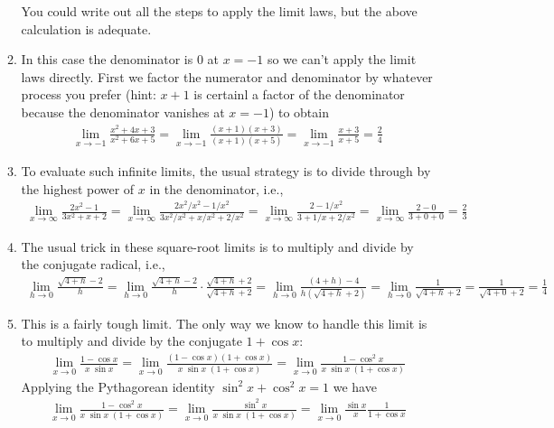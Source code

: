 \documentclass{article}
\begin{document}
\begin{enumerate}
\begin{enumerate}
    You could write out all the steps to apply the limit laws, but the 
    above calculation is adequate.
  \item In this case the denominator is $0$ at $x=-1$ so we can't apply
    the limit laws directly.  First we factor the numerator and denominator
    by whatever process you prefer (hint: $x+1$ is certainl a factor of 
    the denominator because the denominator vanishes at $x=-1$) to obtain
    \begin{align*}
      \lim_{x\to -1} \frac{x^2+4x+3}{x^2+6x+5}
      = \lim_{x\to -1} \frac{(x+1)(x+3)}{(x+1)(x+5)}
      = \lim_{x\to -1} \frac{x+3}{x+5}
      = \frac{2}{4}
    \end{align*}
  \item To evaluate such infinite limits, the usual strategy is to divide
    through by the highest power of $x$ in the denominator, i.e.,
    \begin{align*}
      \lim_{x\to\infty} \frac{2x^2-1}{3x^2+x+2}
      = \lim_{x\to\infty} \frac{2x^2/x^2-1/x^2}{3x^2/x^2+x/x^2+2/x^2}
      = \lim_{x\to\infty} \frac{2-1/x^2}{3+1/x+2/x^2}
      = \lim_{x\to\infty} \frac{2-0}{3+0+0}
      = \frac{2}{3}
    \end{align*}
  \item The usual trick in these square-root limits is to multiply 
    and divide by the conjugate radical, i.e.,
    \begin{align*}
      \lim_{h\to 0} \frac{\sqrt{4+h}-2}{h}
      = \lim_{h\to 0} \frac{\sqrt{4+h}-2}{h} \cdot 
      \frac{\sqrt{4+h}+2}{\sqrt{4+h}+2}
      = \lim_{h\to 0} \frac{(4+h)-4}{h(\sqrt{4+h}+2)}
      = \lim_{h\to 0} \frac{1}{\sqrt{4+h}+2}
      = \frac{1}{\sqrt{4+0}+2}
      = \frac{1}{4}
    \end{align*}
  \item This is a fairly tough limit.  The only way we know to handle
    this limit is to multiply and divide by the conjugate $1+\cos x$:
    \begin{align*}
      \lim_{x\to 0} \frac{1-\cos x}{x \; \sin x}
      = \lim_{x\to 0} \frac{(1-\cos x)(1+\cos x)}{x\; \sin x \; (1+\cos x)}
      = \lim_{x\to 0} \frac{1-\cos^2 x}{x\; \sin x \; (1+\cos x)}
    \end{align*}
    Applying the Pythagorean identity $\sin^2 x + \cos^2 x = 1$ we have
    \begin{align*}
      \lim_{x\to 0} \frac{1-\cos^2 x}{x\; \sin x \; (1+\cos x)}
      = \lim_{x\to 0} \frac{\sin^2 x}{x \; \sin x \; (1+\cos x)}
      = \lim_{x\to 0} \frac{\sin x}{x} \frac{1}{1+\cos x}

\end{align*}
\end{enumerate}
\end{enumerate}
\end{document}

